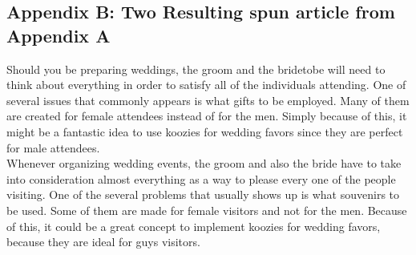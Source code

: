\documentclass[11pt,letterpaper,oneside, titlepage]{scrartcl}
\begin{document}
\subsection{Appendix B: Two Resulting spun article from Appendix A}


Should you be preparing weddings, the groom and the bridetobe will need to think about everything in order to satisfy all of the individuals attending. One of several issues that commonly appears is what gifts to be employed. Many of them are created for female attendees instead of for the men. Simply because of this, it might be a fantastic idea to use koozies for wedding favors since they are perfect for male attendees.
\\

Whenever organizing wedding events, the groom and also the bride have to take into consideration almost everything as a way to please every one of the people visiting. One of the several problems that usually shows up is what souvenirs to be used. Some of them are made for female visitors and not for the men. Because of this, it could be a great concept to implement koozies for wedding favors, because they are ideal for guys visitors.
\end{document}
